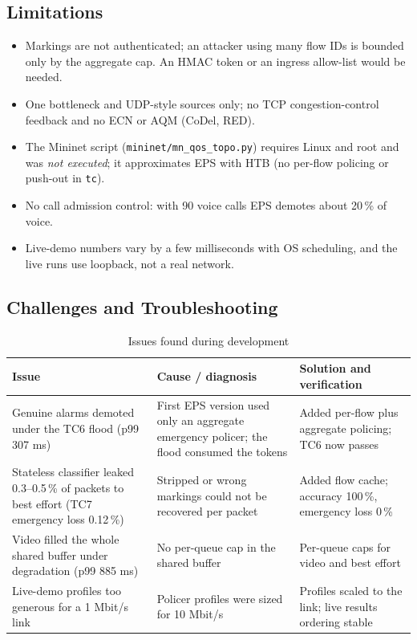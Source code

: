 \documentclass[12pt,a4paper]{article}
\newcommand{\code}[1]{\texttt{#1}}
\begin{document}
\subsection{Limitations}\label{sec:limitations}
\begin{itemize}
\item Markings are not authenticated; an attacker using many flow IDs is bounded only by the aggregate cap. An HMAC token or an ingress allow-list would be needed.
\item One bottleneck and UDP-style sources only; no TCP congestion-control feedback and no ECN or AQM (CoDel, RED).
\item The Mininet script (\code{mininet/mn\_qos\_topo.py}) requires Linux and root and was \emph{not executed}; it approximates EPS with HTB (no per-flow policing or push-out in \code{tc}).
\item No call admission control: with 90 voice calls EPS demotes about 20\,\% of voice.
\item Live-demo numbers vary by a few milliseconds with OS scheduling, and the live runs use loopback, not a real network.
\end{itemize}

\subsection{Challenges and Troubleshooting}\label{sec:challenges}
\begin{table}[H]\centering\small
\caption{Issues found during development}\label{tab:issues}
\begin{tabularx}{\textwidth}{|X|X|X|}\hline
\textbf{Issue} & \textbf{Cause / diagnosis} & \textbf{Solution and verification}\\\hline
Genuine alarms demoted under the TC6 flood (p99 307 ms) & First EPS version used only an aggregate emergency policer; the flood consumed the tokens & Added per-flow plus aggregate policing; TC6 now passes\\\hline
Stateless classifier leaked 0.3--0.5\,\% of packets to best effort (TC7 emergency loss 0.12\,\%) & Stripped or wrong markings could not be recovered per packet & Added flow cache; accuracy 100\,\%, emergency loss 0\,\%\\\hline
Video filled the whole shared buffer under degradation (p99 885 ms) & No per-queue cap in the shared buffer & Per-queue caps for video and best effort\\\hline
Live-demo profiles too generous for a 1 Mbit/s link & Policer profiles were sized for 10 Mbit/s & Profiles scaled to the link; live results ordering stable\\\hline
\end{tabularx}
\end{table}
\end{document}
